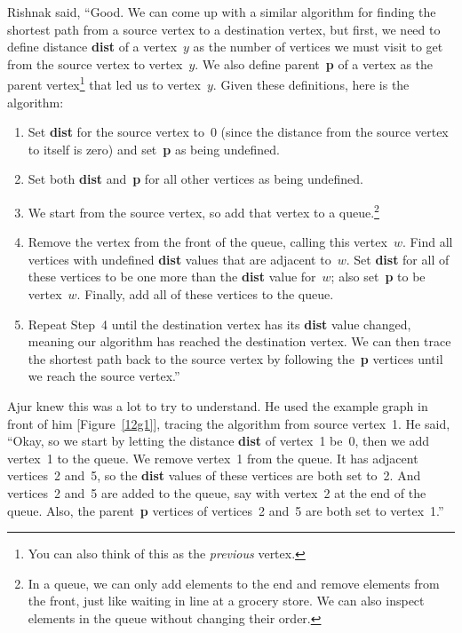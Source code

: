 Rishnak said, ``Good. We can come up with a similar algorithm for finding the shortest path from a source vertex to a destination vertex, but first, we need to define distance \textbf{dist} of a vertex~$y$ as the number of vertices we must visit to get from the source vertex to vertex~$y$. We also define parent~\textbf{p} of a vertex as the parent vertex\footnote{You can also think of this as the \textit{previous} vertex.} that led us to vertex~$y$. Given these definitions, here is the algorithm:
\begin{enumerate}
\item Set \textbf{dist} for the source vertex to~0 (since the distance from the source vertex to itself is zero) and set~\textbf{p} as being undefined.
\item Set both \textbf{dist} and~\textbf{p} for all other vertices as being undefined.
\item We start from the source vertex, so add that vertex to a queue.\footnote{In a queue, we can only add elements to the end and remove elements from the front, just like waiting in line at a grocery store. We can also inspect elements in the queue without changing their order.}
\item Remove the vertex from the front of the queue, calling this vertex~$w$. Find all vertices with undefined \textbf{dist} values that are adjacent to~$w$. Set \textbf{dist} for all of these vertices to be one more than the \textbf{dist} value for~$w$; also set~\textbf{p} to be vertex~$w$. Finally, add all of these vertices to the queue.
\item Repeat Step~4 until the destination vertex has its \textbf{dist} value changed, meaning our algorithm has reached the destination vertex. We can then trace the shortest path back to the source vertex by following the~\textbf{p} vertices until we reach the source vertex.''
\end{enumerate}

Ajur knew this was a lot to try to understand. He used the example graph in front of him [Figure~\ref{12g1}], tracing the algorithm from source vertex~1. He said, ``Okay, so we start by letting the distance \textbf{dist} of vertex~1 be~0, then we add vertex~1 to the queue. We remove vertex~1 from the queue. It has adjacent vertices~2 and~5, so the \textbf{dist} values of these vertices are both set to~2. And vertices~2 and~5 are added to the queue, say with vertex~2 at the end of the queue. Also, the parent~\textbf{p} vertices of vertices~2 and~5 are both set to vertex~1.''

